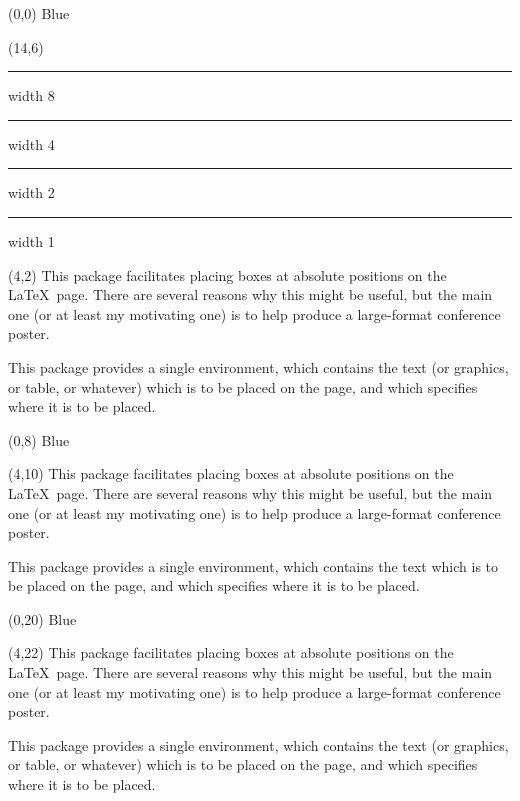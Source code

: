 \documentclass{article}
\begin{document}

\begin{textblock}{4}(0,0)
  Blue
\end{textblock}

\begin{textblock}{8}(14,6)
  \hrule width 8\TPHorizModule
  \TPVertModule
  \hrule width 4\TPHorizModule
  \TPVertModule
  \hrule width 2\TPHorizModule
  \TPVertModule
  \hrule width 1\TPHorizModule
\end{textblock}  

\begin{textblock}{8}(4,2)
  This package facilitates placing boxes at absolute positions on the
  \LaTeX\ page.  There are several reasons why this might be useful, but
  the main one (or at least my motivating one) is to help produce a
  large-format conference poster.  

  This package provides a single environment, which contains the text
  (or graphics, or table, or whatever) which is to be placed on the
  page, and which specifies where it is to be placed.
\end{textblock}

\TPshowboxestrue
{}
\setlength\TPboxrulesize{0.25\TPHorizModule}

\TPMargin{0.5\TPHorizModule}

\begin{textblock}{4}(0,8)
  Blue
\end{textblock}

\begin{textblock}{8}(4,10)
  This package facilitates placing boxes at absolute positions on the
  \LaTeX\ page.  There are several reasons why this might be useful, but
  the main one (or at least my motivating one) is to help produce a
  large-format conference poster.  

  This package provides a single environment, which contains the text
  which is to be placed on the
  page, and which specifies where it is to be placed.
\end{textblock}

\TPMargin*{0.5\TPHorizModule}

\begin{textblock}{4}(0,20)
  Blue
\end{textblock}

\begin{textblock}{8}(4,22)
  This package facilitates placing boxes at absolute positions on the
  \LaTeX\ page.  There are several reasons why this might be useful, but
  the main one (or at least my motivating one) is to help produce a
  large-format conference poster.  

  This package provides a single environment, which contains the text
  (or graphics, or table, or whatever) which is to be placed on the
  page, and which specifies where it is to be placed.
\end{textblock}
\end{document}
